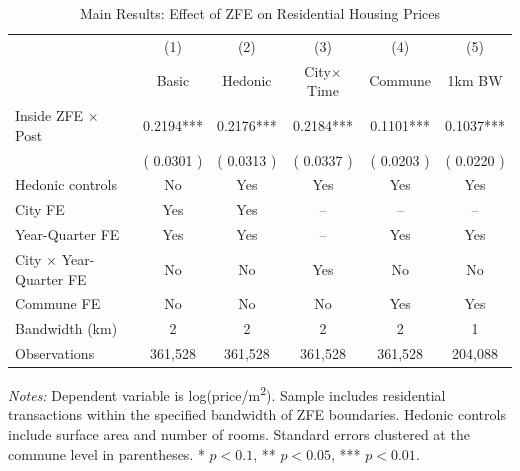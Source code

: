 \begin{table}[htbp]
\centering
\caption{Main Results: Effect of ZFE on Residential Housing Prices}
\label{tab:main}
\begin{tabular}{lccccc}
\hline\hline
 & (1) & (2) & (3) & (4) & (5) \\
 & Basic & Hedonic & City$\times$Time & Commune & 1km BW \\
\hline
Inside ZFE $\times$ Post &  0.2194*** &  0.2176*** &  0.2184*** &  0.1101*** &  0.1037*** \\
  & ( 0.0301 ) & ( 0.0313 ) & ( 0.0337 ) & ( 0.0203 ) & ( 0.0220 ) \\
\hline
Hedonic controls & No & Yes & Yes & Yes & Yes \\
City FE & Yes & Yes & -- & -- & -- \\
Year-Quarter FE & Yes & Yes & -- & Yes & Yes \\
City $\times$ Year-Quarter FE & No & No & Yes & No & No \\
Commune FE & No & No & No & Yes & Yes \\
Bandwidth (km) & 2 & 2 & 2 & 2 & 1 \\
Observations &  361,528 &  361,528 &  361,528 &  361,528 &  204,088 \\
\hline\hline
\end{tabular}
\begin{tablenotes}[flushleft]
\small \textit{Notes:} Dependent variable is log(price/m\textsuperscript{2}). Sample includes residential transactions within the specified bandwidth of ZFE boundaries. Hedonic controls include surface area and number of rooms. Standard errors clustered at the commune level in parentheses. * $p<0.1$, ** $p<0.05$, *** $p<0.01$.
\end{tablenotes}
\end{table}
